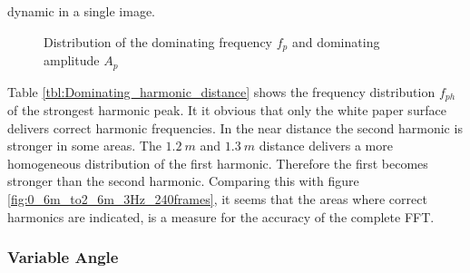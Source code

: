 dynamic in a single image.\\

\begin{figure}[!h]
	\hfill
	\centering
	\caption{Distribution of the dominating frequency $f_p$ and dominating amplitude $A_p$}
\end{figure}

Table \ref{tbl:Dominating_harmonic_distance} shows the frequency distribution $f_{ph}$ of the strongest harmonic peak. It it obvious that only the white paper surface delivers correct harmonic frequencies. In the near distance the second harmonic is stronger in some areas. The $1.2~m$ and $1.3~m$ distance delivers a more homogeneous distribution of the first harmonic. Therefore the first becomes stronger than the second harmonic. Comparing this with figure \ref{fig:0_6m_to2_6m_3Hz_240frames}, it seems that the areas where correct harmonics are indicated, is a measure for the accuracy of the complete FFT.     

\subsubsection{Variable Angle}

